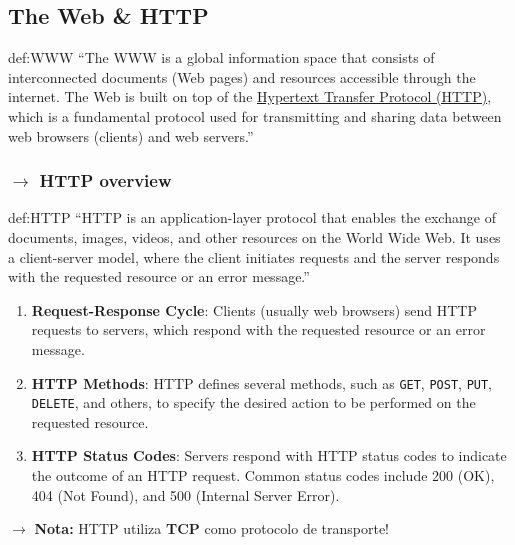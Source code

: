 \clearpage
\subsection[2.2 The Web \& HTTP]{\hspace*{0.075 em}\raisebox{0.2 em}{$\pmb{\drsh}$} The Web \& HTTP}
\label{subsec:the-web-and-http}

\begin{theo}{def:WWW}\label{def:WWW}
    ``The WWW is a global information space that consists of interconnected documents (Web pages) and resources accessible through the internet. The Web is built on top of the \hyperref[def:HTTP]{Hypertext Transfer Protocol (HTTP)}, which is a fundamental protocol used for transmitting and sharing data between web browsers (clients) and web servers.''
\end{theo}

\subsubsection[2.2.1 HTTP overview]{$\pmb{\rightarrow}$ HTTP overview}

\begin{theo}{def:HTTP}\label{def:HTTP}
    ``HTTP is an application-layer protocol that enables the exchange of documents, images, videos, and other resources on the World Wide Web. It uses a client-server model, where the client initiates requests and the server responds with the requested resource or an error message.''

    \vspace{-0.75em}
    \begin{enumerate}
        \item \textbf{Request-Response Cycle}: Clients (usually web browsers) send HTTP requests to servers, which respond with the requested resource or an error message.
        \item \textbf{HTTP Methods}: HTTP defines several methods, such as \texttt{GET}, \texttt{POST}, \texttt{PUT}, \texttt{DELETE}, and others, to specify the desired action to be performed on the requested resource.
        \item \textbf{HTTP Status Codes}: Servers respond with HTTP status codes to indicate the outcome of an HTTP request. Common status codes include 200 (OK), 404 (Not Found), and 500 (Internal Server Error).
    \end{enumerate}

    \noindent $\pmb{\rightarrow}$ \textbf{Nota:} HTTP utiliza \textbf{TCP} como protocolo de transporte!
\end{theo}

